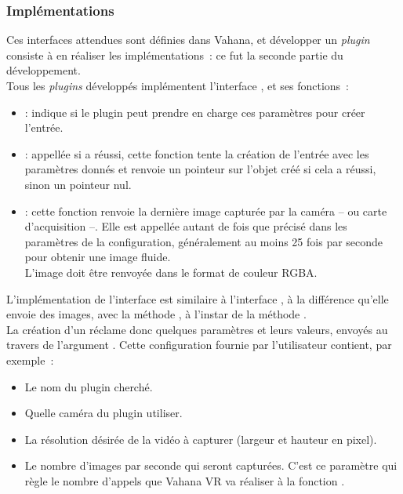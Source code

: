 \subsubsection{Implémentations}
Ces interfaces attendues sont définies dans Vahana, et développer un \textit{plugin} consiste
à en réaliser les implémentations~: ce fut la seconde partie du développement.\\
Tous les \textit{plugins} développés implémentent l'interface ,
et ses fonctions~:
\begin{itemize}
  \item {} : indique si le
  plugin peut prendre en charge ces paramètres pour créer l'entrée.
  \item {} : appellée si 
  a réussi, cette fonction tente la création de l'entrée avec les paramètres donnés
  et renvoie un pointeur sur l'objet  créé si cela a réussi, sinon
  un pointeur nul.
  \item {} : cette fonction renvoie la
  dernière image capturée par la caméra -- ou carte d'acquisition --. Elle est
  appellée autant de fois que précisé dans les paramètres de la configuration,
  généralement au moins 25 fois par seconde pour obtenir une image fluide.\\
  L'image doit être renvoyée dans le format de couleur RGBA.
\end{itemize}
L'implémentation de l'interface  est similaire à l'interface ,
à la différence qu'elle envoie des images, avec la méthode , 
à l'instar de la méthode .\\
\newline
La création d'un  réclame donc quelques paramètres et leurs valeurs, envoyés 
au travers de l'argument . Cette configuration fournie par
l'utilisateur contient, par exemple~:
\begin{itemize}
  \item Le nom du plugin cherché.
  \item Quelle caméra du plugin utiliser.
  \item La résolution désirée de la vidéo à capturer (largeur et hauteur en pixel).
  \item Le nombre d'images par seconde qui seront capturées. C'est ce paramètre qui règle le nombre 
  d'appels que Vahana VR va réaliser à la fonction .
\end{itemize}
